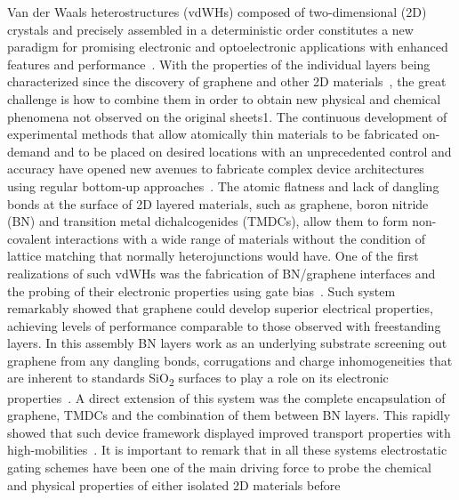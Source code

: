 Van der Waals heterostructures (vdWHs) composed of two-dimensional
(2D) crystals and precisely assembled in a deterministic order
constitutes a new paradigm for promising electronic and optoelectronic
applications with enhanced features and
performance~\cite{Geim_2013_2D_vdw_Het,Jariwala_2016_mixed_vdw_het,Novoselov_2016_vdW,Liu_2016_rev,Withers_2015_LED_vde_Het,Britnell_2012_FET}.
%
With the properties of the individual layers being characterized since
the discovery of graphene and other 2D
materials~\nocite{Novoselov_2005_2D_crystal}, the great challenge is
how to combine them in order to obtain new physical and chemical
phenomena not observed on the original sheets1. The continuous
development of experimental methods that allow atomically thin
materials to be fabricated on-demand and to be placed on desired
locations with an unprecedented control and accuracy have opened new
avenues to fabricate complex device architectures using regular
bottom-up
approaches~\cite{Jariwala_2016_mixed_vdw_het,Novoselov_2016_vdW,Liu_2016_rev}. The
atomic flatness and lack of dangling bonds at the surface of 2D
layered materials, such as graphene, boron nitride (BN) and transition
metal dichalcogenides (TMDCs), allow them to form non-covalent
interactions with a wide range of materials without the condition of
lattice matching that normally heterojunctions would have. One of the
first realizations of such vdWHs was the fabrication of BN/graphene
interfaces and the probing of their electronic properties using gate
bias~\cite{Dean_2010_BN_gr_highquality}. Such system remarkably showed
that graphene could develop superior electrical properties, achieving
levels of performance comparable to those observed with freestanding
layers. In this assembly BN layers work as an underlying substrate
screening out graphene from any dangling bonds, corrugations and
charge inhomogeneities that are inherent to standards SiO\textsubscript{2} surfaces to
play a role on its electronic
properties~\cite{Dean_2010_BN_gr_highquality,Xue_2011_STM}. A direct
extension of this system was the complete encapsulation of graphene,
TMDCs and the combination of them between BN
layers\cite{Withers_2015_LED_vde_Het,Britnell_2012_FET,Cui_2015_multiterm_mos2,Xue_2011_STM}. This
rapidly showed that such device framework displayed improved transport
properties with
high-mobilities~\cite{Xue_2011_STM,Dean_2010_BN_gr_highquality}. It is
important to remark that in all these systems electrostatic gating
schemes have been one of the main driving force to probe the chemical
and physical properties of either isolated 2D materials before
